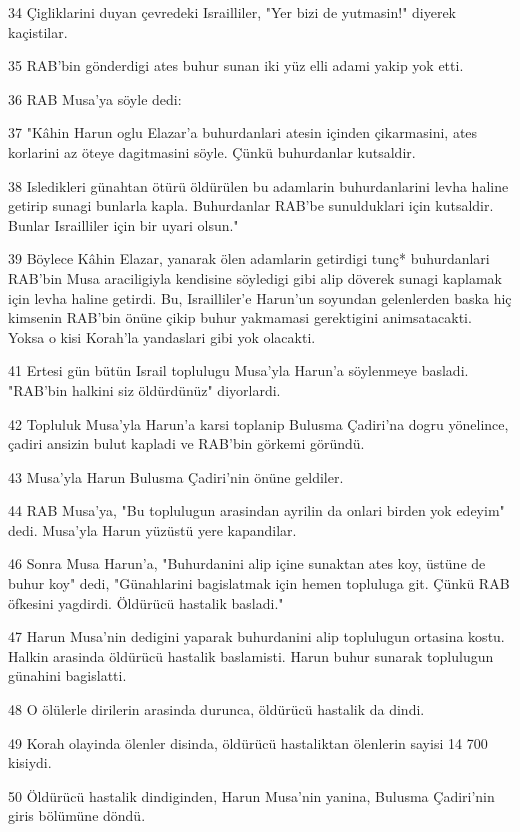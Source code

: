 \par 34 Çigliklarini duyan çevredeki Israilliler, "Yer bizi de yutmasin!" diyerek kaçistilar.
\par 35 RAB'bin gönderdigi ates buhur sunan iki yüz elli adami yakip yok etti.
\par 36 RAB Musa'ya söyle dedi:
\par 37 "Kâhin Harun oglu Elazar'a buhurdanlari atesin içinden çikarmasini, ates korlarini az öteye dagitmasini söyle. Çünkü buhurdanlar kutsaldir.
\par 38 Isledikleri günahtan ötürü öldürülen bu adamlarin buhurdanlarini levha haline getirip sunagi bunlarla kapla. Buhurdanlar RAB'be sunulduklari için kutsaldir. Bunlar Israilliler için bir uyari olsun."
\par 39 Böylece Kâhin Elazar, yanarak ölen adamlarin getirdigi tunç* buhurdanlari RAB'bin Musa araciligiyla kendisine söyledigi gibi alip döverek sunagi kaplamak için levha haline getirdi. Bu, Israilliler'e Harun'un soyundan gelenlerden baska hiç kimsenin RAB'bin önüne çikip buhur yakmamasi gerektigini animsatacakti. Yoksa o kisi Korah'la yandaslari gibi yok olacakti.
\par 41 Ertesi gün bütün Israil toplulugu Musa'yla Harun'a söylenmeye basladi. "RAB'bin halkini siz öldürdünüz" diyorlardi.
\par 42 Topluluk Musa'yla Harun'a karsi toplanip Bulusma Çadiri'na dogru yönelince, çadiri ansizin bulut kapladi ve RAB'bin görkemi göründü.
\par 43 Musa'yla Harun Bulusma Çadiri'nin önüne geldiler.
\par 44 RAB Musa'ya, "Bu toplulugun arasindan ayrilin da onlari birden yok edeyim" dedi. Musa'yla Harun yüzüstü yere kapandilar.
\par 46 Sonra Musa Harun'a, "Buhurdanini alip içine sunaktan ates koy, üstüne de buhur koy" dedi, "Günahlarini bagislatmak için hemen topluluga git. Çünkü RAB öfkesini yagdirdi. Öldürücü hastalik basladi."
\par 47 Harun Musa'nin dedigini yaparak buhurdanini alip toplulugun ortasina kostu. Halkin arasinda öldürücü hastalik baslamisti. Harun buhur sunarak toplulugun günahini bagislatti.
\par 48 O ölülerle dirilerin arasinda durunca, öldürücü hastalik da dindi.
\par 49 Korah olayinda ölenler disinda, öldürücü hastaliktan ölenlerin sayisi 14 700 kisiydi.
\par 50 Öldürücü hastalik dindiginden, Harun Musa'nin yanina, Bulusma Çadiri'nin giris bölümüne döndü.


